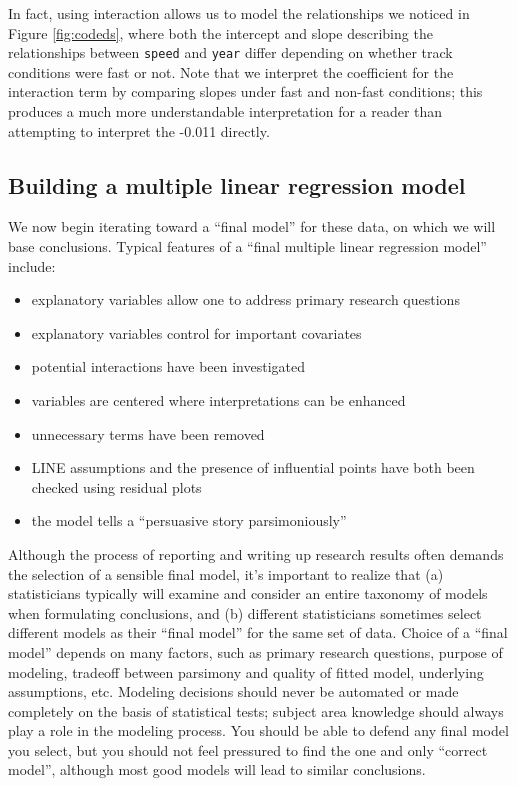 \documentclass[
]{krantz}
\providecommand{\tightlist}{%
  \setlength{\itemsep}{0pt}\setlength{\parskip}{0pt}}
\begin{document}
In fact, using interaction allows us to model the relationships we noticed in Figure \ref{fig:codeds}, where both the intercept and slope describing the relationships between \texttt{speed} and \texttt{year} differ depending on whether track conditions were fast or not. Note that we interpret the coefficient for the interaction term by comparing slopes under fast and non-fast conditions; this produces a much more understandable interpretation for a reader than attempting to interpret the -0.011 directly.

\hypertarget{multreg_build}{%
\subsection{Building a multiple linear regression model}\label{multreg_build}}

We now begin iterating toward a ``final model'' for these data, on which we will base conclusions. Typical features of a ``final multiple linear regression model'' include:

\begin{itemize}
\tightlist
\item
  explanatory variables allow one to address primary research questions
\item
  explanatory variables control for important covariates
\item
  potential interactions have been investigated
\item
  variables are centered where interpretations can be enhanced
\item
  unnecessary terms have been removed
\item
  LINE assumptions and the presence of influential points have both been checked using residual plots
\item
  the model tells a ``persuasive story parsimoniously''
\end{itemize}

Although the process of reporting and writing up research results often demands the selection of a sensible final model, it's important to realize that (a) statisticians typically will examine and consider an entire taxonomy of models when formulating conclusions, and (b) different statisticians sometimes select different models as their ``final model'' for the same set of data. Choice of a ``final model'' depends on many factors, such as primary research questions, purpose of modeling, tradeoff between parsimony and quality of fitted model, underlying assumptions, etc. Modeling decisions should never be automated or made completely on the basis of statistical tests; subject area knowledge should always play a role in the modeling process. You should be able to defend any final model you select, but you should not feel pressured to find the one and only ``correct model'', although most good models will lead to similar conclusions.
\end{document}
